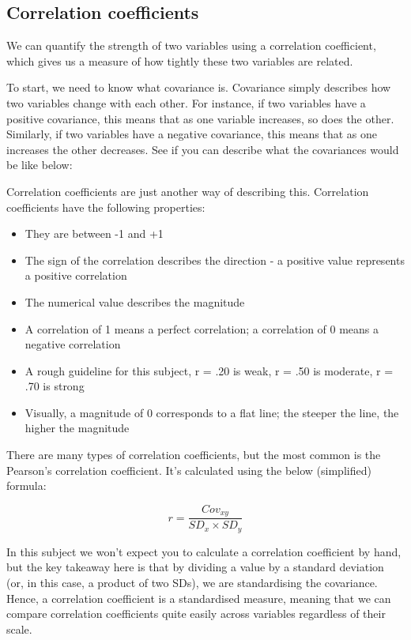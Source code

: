 \documentclass[
]{book}
\providecommand{\tightlist}{%
  \setlength{\itemsep}{0pt}\setlength{\parskip}{0pt}}
\begin{document}
\hypertarget{correlation-coefficients}{%
\subsection{Correlation coefficients}\label{correlation-coefficients}}

We can quantify the strength of two variables using a correlation coefficient, which gives us a measure of how tightly these two variables are related.

To start, we need to know what covariance is. Covariance simply describes how two variables change with each other. For instance, if two variables have a positive covariance, this means that as one variable increases, so does the other. Similarly, if two variables have a negative covariance, this means that as one increases the other decreases. See if you can describe what the covariances would be like below:



Correlation coefficients are just another way of describing this. Correlation coefficients have the following properties:

\begin{itemize}
\tightlist
\item
  They are between -1 and +1
\item
  The sign of the correlation describes the direction - a positive value represents a positive correlation
\item
  The numerical value describes the magnitude
\item
  A correlation of 1 means a perfect correlation; a correlation of 0 means a negative correlation
\item
  A rough guideline for this subject, r = .20 is weak, r = .50 is moderate, r = .70 is strong
\item
  Visually, a magnitude of 0 corresponds to a flat line; the steeper the line, the higher the magnitude
\end{itemize}

There are many types of correlation coefficients, but the most common is the Pearson's correlation coefficient. It's calculated using the below (simplified) formula:

\[
r = \frac{Cov_{xy}}{SD_x \times SD_y}
\]

In this subject we won't expect you to calculate a correlation coefficient by hand, but the key takeaway here is that by dividing a value by a standard deviation (or, in this case, a product of two SDs), we are standardising the covariance. Hence, a correlation coefficient is a standardised measure, meaning that we can compare correlation coefficients quite easily across variables regardless of their scale.
\end{document}
